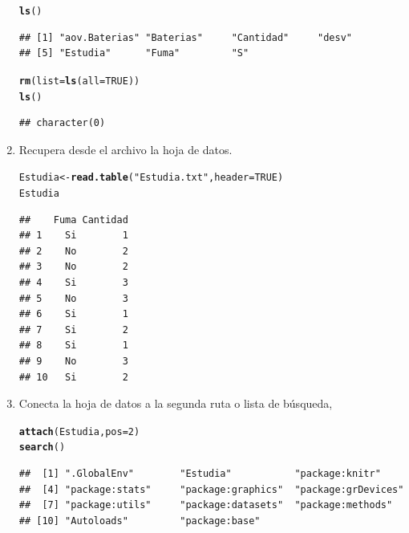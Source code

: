 \documentclass[12pt,letterpaper]{article}\usepackage[]{graphicx}\usepackage[]{color}
\makeatletter
\newcommand{\hlnum}[1]{\textcolor[rgb]{0.686,0.059,0.569}{#1}}%
\newcommand{\hlstr}[1]{\textcolor[rgb]{0.192,0.494,0.8}{#1}}%
\newcommand{\hlstd}[1]{\textcolor[rgb]{0.345,0.345,0.345}{#1}}%
\newcommand{\hlkwb}[1]{\textcolor[rgb]{0.69,0.353,0.396}{#1}}%
\newcommand{\hlkwc}[1]{\textcolor[rgb]{0.333,0.667,0.333}{#1}}%
\newcommand{\hlkwd}[1]{\textcolor[rgb]{0.737,0.353,0.396}{\textbf{#1}}}%
\newenvironment{kframe}{%
 \def\at@end@of@kframe{}%
 \ifinner\ifhmode%
  \def\at@end@of@kframe{\end{minipage}}%
  \begin{minipage}{\columnwidth}%
 \fi\fi%
 \def\FrameCommand##1{\hskip\@totalleftmargin \hskip-\fboxsep
 \colorbox{shadecolor}{##1}\hskip-\fboxsep
     \hskip-\linewidth \hskip-\@totalleftmargin \hskip\columnwidth}%
 \MakeFramed {\advance\hsize-\width
   \@totalleftmargin\z@ \linewidth\hsize
   \@setminipage}}%
 {\par\unskip\endMakeFramed%
 \at@end@of@kframe}
\newenvironment{knitrout}{}{} %
\makeatother
\begin{document}
\begin{enumerate}
\begin{knitrout}
\color{fgcolor}\begin{kframe}
\begin{alltt}
\hlkwd{ls}\hlstd{()}
\end{alltt}
\begin{verbatim}
## [1] "aov.Baterias" "Baterias"     "Cantidad"     "desv"        
## [5] "Estudia"      "Fuma"         "S"
\end{verbatim}
\begin{alltt}
\hlkwd{rm}\hlstd{(}\hlkwc{list}\hlstd{=}\hlkwd{ls}\hlstd{(}\hlkwc{all}\hlstd{=}\hlnum{TRUE}\hlstd{))}
\hlkwd{ls}\hlstd{()}
\end{alltt}
\begin{verbatim}
## character(0)
\end{verbatim}
\end{kframe}
\end{knitrout}

\item Recupera desde el archivo la hoja de datos. 

\begin{knitrout}
\color{fgcolor}\begin{kframe}
\begin{alltt}
\hlstd{Estudia} \hlkwb{<-} \hlkwd{read.table}\hlstd{(}\hlstr{"Estudia.txt"}\hlstd{,} \hlkwc{header}\hlstd{=}\hlnum{TRUE}\hlstd{)}
\hlstd{Estudia}
\end{alltt}
\begin{verbatim}
##    Fuma Cantidad
## 1    Si        1
## 2    No        2
## 3    No        2
## 4    Si        3
## 5    No        3
## 6    Si        1
## 7    Si        2
## 8    Si        1
## 9    No        3
## 10   Si        2
\end{verbatim}
\end{kframe}
\end{knitrout}

\item Conecta la hoja de datos a la segunda ruta o lista de b\'usqueda,

\begin{knitrout}
\color{fgcolor}\begin{kframe}
\begin{alltt}
\hlkwd{attach}\hlstd{(Estudia,} \hlkwc{pos}\hlstd{=}\hlnum{2}\hlstd{)}
\hlkwd{search}\hlstd{()}
\end{alltt}
\begin{verbatim}
##  [1] ".GlobalEnv"        "Estudia"           "package:knitr"    
##  [4] "package:stats"     "package:graphics"  "package:grDevices"
##  [7] "package:utils"     "package:datasets"  "package:methods"  
## [10] "Autoloads"         "package:base"
\end{verbatim}
\end{kframe}
\end{knitrout}


\end{enumerate}
\end{document}

